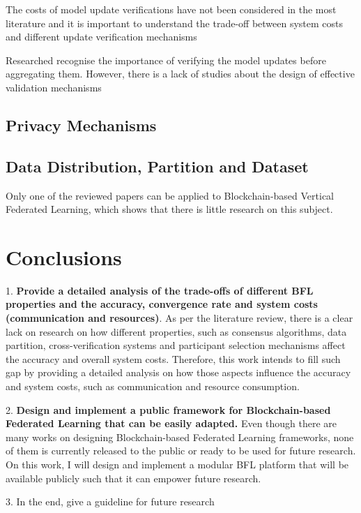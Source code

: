 The costs of model update verifications have not been considered in the most literature and it is important to understand the trade-off between system costs and different update verification mechanisms \cite{9403374}

Researched recognise the importance of verifying the model updates before aggregating them. However, there is a lack of studies about the design of effective validation mechanisms \cite{10.48550/arxiv.2110.02182}

\subsection{Privacy Mechanisms}

\subsection{Data Distribution, Partition and Dataset}



 Only one of the reviewed papers can be applied to Blockchain-based Vertical Federated Learning, which shows that there is little research on this subject.

\section{Conclusions}

1. \textbf{Provide a detailed analysis of the trade-offs of different BFL properties and the accuracy, convergence rate and system costs (communication and resources)}. As per the literature review, there is a clear lack on research on how different properties, such as consensus algorithms, data partition, cross-verification systems and participant selection mechanisms affect the accuracy and overall system costs. Therefore, this work intends to fill such gap by providing a detailed analysis on how those aspects influence the accuracy and system costs, such as communication and resource consumption.

2. \textbf{Design and implement a public framework for Blockchain-based Federated Learning that can be easily adapted.} Even though there are many works on designing Blockchain-based Federated Learning frameworks, none of them is currently released to the public or ready to be used for future research. On this work, I will design and implement a modular BFL platform that will be available publicly such that it can empower future research.

3. In the end, give a guideline for future research